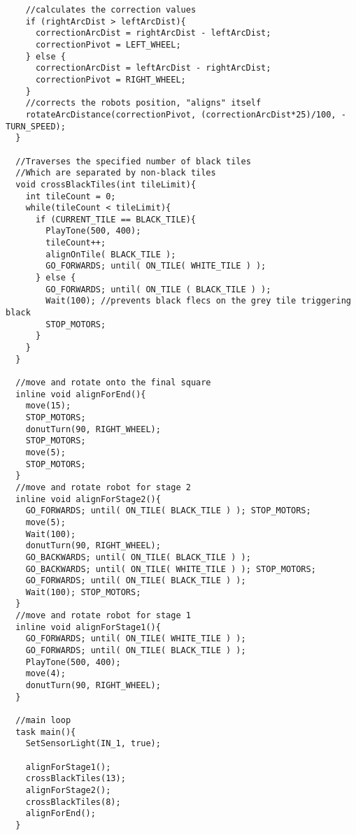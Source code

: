 \documentclass[a4paper,11pt]{article}
\begin{document}
\begin{lstlisting}
    //calculates the correction values
    if (rightArcDist > leftArcDist){
      correctionArcDist = rightArcDist - leftArcDist;
      correctionPivot = LEFT_WHEEL;
    } else {
      correctionArcDist = leftArcDist - rightArcDist;
      correctionPivot = RIGHT_WHEEL;
    }
    //corrects the robots position, "aligns" itself
    rotateArcDistance(correctionPivot, (correctionArcDist*25)/100, -TURN_SPEED);
  }

  //Traverses the specified number of black tiles
  //Which are separated by non-black tiles
  void crossBlackTiles(int tileLimit){
    int tileCount = 0;
    while(tileCount < tileLimit){
      if (CURRENT_TILE == BLACK_TILE){
        PlayTone(500, 400);
        tileCount++;
        alignOnTile( BLACK_TILE );
        GO_FORWARDS; until( ON_TILE( WHITE_TILE ) );
      } else {
        GO_FORWARDS; until( ON_TILE ( BLACK_TILE ) );
        Wait(100); //prevents black flecs on the grey tile triggering black
        STOP_MOTORS;
      }
    }
  }

  //move and rotate onto the final square
  inline void alignForEnd(){
    move(15);
    STOP_MOTORS;
    donutTurn(90, RIGHT_WHEEL);
    STOP_MOTORS;
    move(5);
    STOP_MOTORS;
  }
  //move and rotate robot for stage 2
  inline void alignForStage2(){
    GO_FORWARDS; until( ON_TILE( BLACK_TILE ) ); STOP_MOTORS;
    move(5);
    Wait(100);
    donutTurn(90, RIGHT_WHEEL);
    GO_BACKWARDS; until( ON_TILE( BLACK_TILE ) );
    GO_BACKWARDS; until( ON_TILE( WHITE_TILE ) ); STOP_MOTORS;
    GO_FORWARDS; until( ON_TILE( BLACK_TILE ) );
    Wait(100); STOP_MOTORS;
  }
  //move and rotate robot for stage 1
  inline void alignForStage1(){
    GO_FORWARDS; until( ON_TILE( WHITE_TILE ) );
    GO_FORWARDS; until( ON_TILE( BLACK_TILE ) );
    PlayTone(500, 400);
    move(4);
    donutTurn(90, RIGHT_WHEEL);
  }

  //main loop
  task main(){
    SetSensorLight(IN_1, true);

    alignForStage1();
    crossBlackTiles(13);
    alignForStage2();
    crossBlackTiles(8);
    alignForEnd();
  }
\end{lstlisting}
\end{document}
